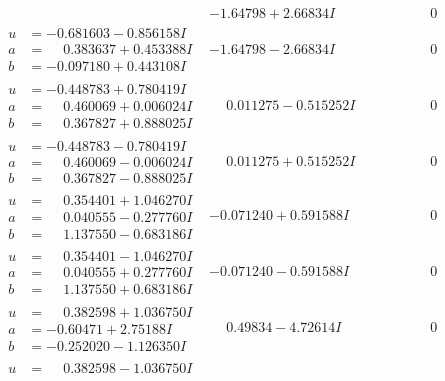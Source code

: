 \documentclass[1p]{elsarticle_modified}
\theoremstyle{definition}
\begin{document}
$$\begin{array}{c|c|c}
 & -1.64798 + 2.66834 I & \phantom{-0.000000 } 0 \\ \hline\begin{aligned}
u &= -0.681603 - 0.856158 I \\
a &= \phantom{-}0.383637 + 0.453388 I \\
b &= -0.097180 + 0.443108 I\end{aligned}
 & -1.64798 - 2.66834 I & \phantom{-0.000000 } 0 \\ \hline\begin{aligned}
u &= -0.448783 + 0.780419 I \\
a &= \phantom{-}0.460069 + 0.006024 I \\
b &= \phantom{-}0.367827 + 0.888025 I\end{aligned}
 & \phantom{-}0.011275 - 0.515252 I & \phantom{-0.000000 } 0 \\ \hline\begin{aligned}
u &= -0.448783 - 0.780419 I \\
a &= \phantom{-}0.460069 - 0.006024 I \\
b &= \phantom{-}0.367827 - 0.888025 I\end{aligned}
 & \phantom{-}0.011275 + 0.515252 I & \phantom{-0.000000 } 0 \\ \hline\begin{aligned}
u &= \phantom{-}0.354401 + 1.046270 I \\
a &= \phantom{-}0.040555 - 0.277760 I \\
b &= \phantom{-}1.137550 - 0.683186 I\end{aligned}
 & -0.071240 + 0.591588 I & \phantom{-0.000000 } 0 \\ \hline\begin{aligned}
u &= \phantom{-}0.354401 - 1.046270 I \\
a &= \phantom{-}0.040555 + 0.277760 I \\
b &= \phantom{-}1.137550 + 0.683186 I\end{aligned}
 & -0.071240 - 0.591588 I & \phantom{-0.000000 } 0 \\ \hline\begin{aligned}
u &= \phantom{-}0.382598 + 1.036750 I \\
a &= -0.60471 + 2.75188 I \\
b &= -0.252020 - 1.126350 I\end{aligned}
 & \phantom{-}0.49834 - 4.72614 I & \phantom{-0.000000 } 0 \\ \hline\begin{aligned}
u &= \phantom{-}0.382598 - 1.036750 I \\

\end{aligned}
\end{array}$$
\end{document}
